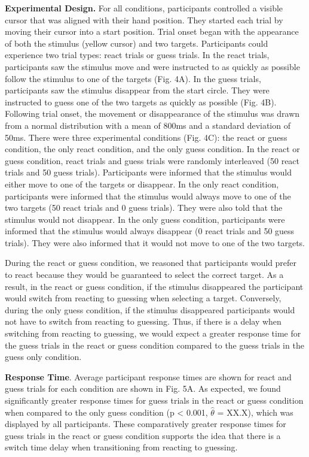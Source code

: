 \documentclass[12pt,letterpaper]{article}
\begin{document}
\noindent\textbf{\textcolor{mydarkblue}{{Experimental Design.}}}
For all conditions, participants controlled a visible cursor that was aligned with their hand position. They started each trial by moving their cursor into a start position. Trial onset began with the appearance of both the stimulus (yellow cursor) and two targets. Participants could experience two trial types: react trials or guess trials. In the react trials, participants saw the stimulus move and were instructed to as quickly as possible follow the stimulus to one of the targets (Fig. 4A). In the guess trials, participants saw the stimulus disappear from the start circle. They were instructed to guess one of the two targets as quickly as possible (Fig. 4B). Following trial onset, the movement or disappearance of the stimulus was drawn from a normal distribution with a mean of 800ms and a standard deviation of 50ms. There were three experimental conditions (Fig. 4C): the react or guess condition, the only react condition, and the only guess condition. In the react or guess condition, react trials and guess trials were randomly interleaved (50 react trials and 50 guess trials). Participants were informed that the stimulus would either move to one of the targets or disappear. In the only react condition, participants were informed that the stimulus would always move to one of the two targets (50 react trials and 0 guess trials). They were also told that the stimulus would not disappear. In the only guess condition, participants were informed that the stimulus would always disappear (0 react trials and 50 guess trials). They were also informed that it would not move to one of the two targets.

During the react or guess condition, we reasoned that participants would prefer to react because they would be guaranteed to select the correct target. As a result, in the react or guess condition, if the stimulus disappeared the participant would switch from reacting to guessing when selecting a target. Conversely, during the only guess condition, if the stimulus disappeared participants would not have to switch from reacting to guessing. Thus, if there is a delay when switching from reacting to guessing, we would expect a greater response time for the guess trials in the react or guess condition compared to the guess trials in the guess only condition.

\textbf{Response Time}. Average participant response times are shown for react and guess trials for each condition are shown in Fig. 5A. As expected, we found significantly greater response times for guess trials in the react or guess condition when compared to the only guess condition (p < 0.001, $\hat{\theta}$ = XX.X), which was displayed by all participants. These comparatively greater response times for guess trials in the react or guess condition supports the idea that there is a switch time delay when transitioning from reacting to guessing.
\end{document}
